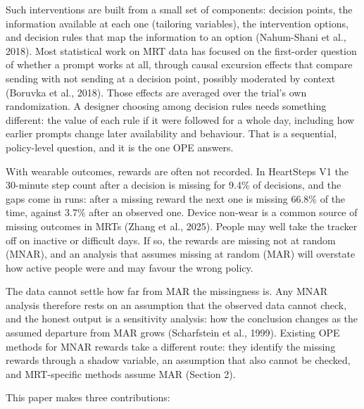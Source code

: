 \documentclass[12pt]{article}
\begin{document}
Such interventions are built from a small set of components: decision points, the information available at each one (tailoring variables), the intervention options, and decision rules that map the information to an option (Nahum-Shani et al., 2018). Most statistical work on MRT data has focused on the first-order question of whether a prompt works at all, through causal excursion effects that compare sending with not sending at a decision point, possibly moderated by context (Boruvka et al., 2018). Those effects are averaged over the trial's own randomization. A designer choosing among decision rules needs something different: the value of each rule if it were followed for a whole day, including how earlier prompts change later availability and behaviour. That is a sequential, policy-level question, and it is the one OPE answers.

With wearable outcomes, rewards are often not recorded. In HeartSteps V1 the 30-minute step count after a decision is missing for 9.4\% of decisions, and the gaps come in runs: after a missing reward the next one is missing 66.8\% of the time, against 3.7\% after an observed one. Device non-wear is a common source of missing outcomes in MRTs (Zhang et al., 2025). People may well take the tracker off on inactive or difficult days. If so, the rewards are missing not at random (MNAR), and an analysis that assumes missing at random (MAR) will overstate how active people were and may favour the wrong policy.

The data cannot settle how far from MAR the missingness is. Any MNAR analysis therefore rests on an assumption that the observed data cannot check, and the honest output is a sensitivity analysis: how the conclusion changes as the assumed departure from MAR grows (Scharfstein et al., 1999). Existing OPE methods for MNAR rewards take a different route: they identify the missing rewards through a shadow variable, an assumption that also cannot be checked, and MRT-specific methods assume MAR (Section 2).

This paper makes three contributions:
\end{document}
